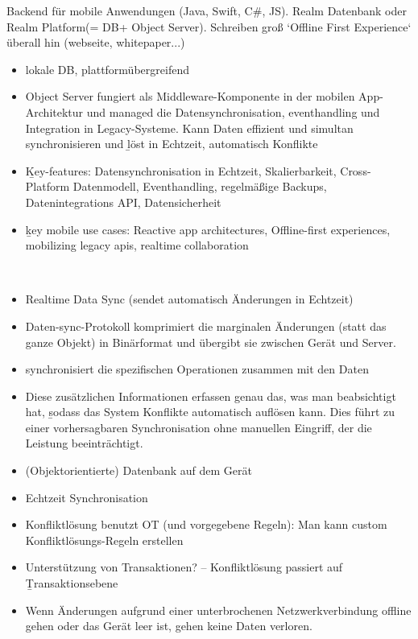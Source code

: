 Backend für mobile Anwendungen (Java, Swift, C\#, JS). Realm Datenbank oder Realm Platform(= DB+ Object Server).
Schreiben groß `Offline First Experience` überall hin (webseite, whitepaper...)
\begin{itemize}
  \item lokale DB, plattformübergreifend
  \item Object Server fungiert als Middleware-Komponente in der mobilen \gls{App}-Architektur und managed die Datensynchronisation, eventhandling und Integration in Legacy-Systeme. Kann Daten effizient und simultan synchronisieren und \b{löst in Echtzeit, automatisch Konflikte}
  \item \b{Key-features:} Datensynchronisation in Echtzeit, Skalierbarkeit, Cross-Platform Datenmodell, Eventhandling, regelmäßige Backups, Datenintegrations API, Datensicherheit
  \item \b{key mobile use cases:} Reactive app architectures, Offline-first experiences, mobilizing legacy apis, realtime collaboration
\end{itemize}~\cite{realm_whitepaper}

\begin{itemize}
  \item Realtime Data Sync (sendet automatisch Änderungen in Echtzeit)
  \item Daten-sync-Protokoll komprimiert die marginalen Änderungen (statt das ganze Objekt) in Binärformat und übergibt sie zwischen Gerät und Server.
  \item synchronisiert die spezifischen Operationen zusammen mit den Daten
  \item Diese zusätzlichen Informationen erfassen genau das, was man beabsichtigt hat, \b{sodass das System Konflikte automatisch auflösen kann}. Dies führt zu einer vorhersagbaren Synchronisation ohne manuellen Eingriff, der die Leistung beeinträchtigt.
  \item (Objektorientierte) Datenbank auf dem Gerät
  \item Echtzeit Synchronisation
  \item Konfliktlösung benutzt OT (und vorgegebene Regeln): Man kann custom Konfliktlösungs-Regeln erstellen
  \item Unterstützung von Transaktionen? -- Konfliktlösung passiert auf \b{Transaktionsebene}
  \item Wenn Änderungen aufgrund einer unterbrochenen Netzwerkverbindung offline gehen oder das Gerät leer ist, gehen keine Daten verloren.
\end{itemize}~\cite{realm_offline_whitepaper}
